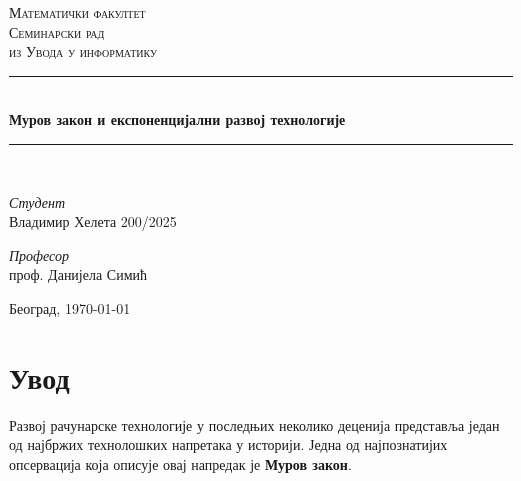 \documentclass{article}
\begin{document}
\begin{titlepage}

\newcommand{\HRule}{\rule{\linewidth}{0.4mm}}

\center 
	
\textsc{\LARGE Математички факултет}\\[3cm] 
	
\textsc{\Large Семинарски рад}\\[0.1cm]
	
\textsc{\large из Увода у информатику}\\[0.5cm] 
	
\HRule\\[0.4cm]
	
{\LARGE\bfseries Муров закон и експоненцијални развој технологије}\\[0.2cm] 
	
\HRule\\[2cm]

\vspace{17\baselineskip}
		

	
	\begin{minipage}{0.4\textwidth}
		\begin{flushleft}
			\large
			\textit{Студент}\\
			Владимир Хелета 200/2025
		\end{flushleft}
	\end{minipage}
\hspace*{1cm}
	\begin{minipage}{0.4\textwidth}
		\begin{flushright}
			\large
			\textit{Професор}\\
			проф. Данијела Симић
		\end{flushright}
	\end{minipage}
	
\vfill\vfill\vfill\vfill 
	
{\large Београд, \today} 
	
\vfill 
	
\end{titlepage}

\tableofcontents
\newpage

\section{Увод}
Развој рачунарске технологије у последњих неколико деценија представља један од 
најбржих технолошких напретака у историји. Једна од најпознатијих опсервација која 
описује овај напредак је \textbf{Муров закон}.
\end{document}

